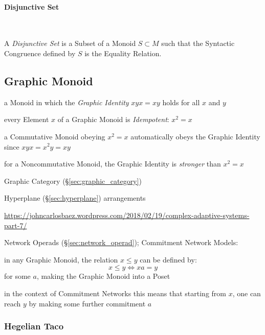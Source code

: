 \paragraph{Disjunctive Set}\label{sec:disjunctive_set}\hfill \\\hfill

A \emph{Disjunctive Set} is a Subset of a Monoid $S \subset M$ such
that the Syntactic Congruence defined by $S$ is the Equality Relation.



\subsection{Graphic Monoid}\label{sec:graphic_monoid}

a Monoid in which the \emph{Graphic Identity} $xyx = xy$ holds for all $x$ and
$y$

every Element $x$ of a Graphic Monoid is \emph{Idempotent}: $x^2 = x$

a Commutative Monoid obeying $x^2 = x$ automatically obeys the Graphic Identity
since $xyx = x^2y = xy$

for a Noncommutative Monoid, the Graphic Identity is \emph{stronger} than $x^2
= x$


Graphic Category (\S\ref{sec:graphic_category})

Hyperplane (\S\ref{sec:hyperplane}) arrangements

\url{https://johncarlosbaez.wordpress.com/2018/02/19/complex-adaptive-systems-part-7/}

Network Operads (\S\ref{sec:network_operad}); Commitment Network Models:

in any Graphic Monoid, the relation $x \leq y$ can be defined by:
\[
  x \leq y \Leftrightarrow x a = y
\]
for some $a$, making the Graphic Monoid into a Poset

in the context of Commitment Networks this means that starting from $x$, one
can reach $y$ by making some further commitment $a$



\subsubsection{Hegelian Taco}\label{sec:hegelian_taco}



